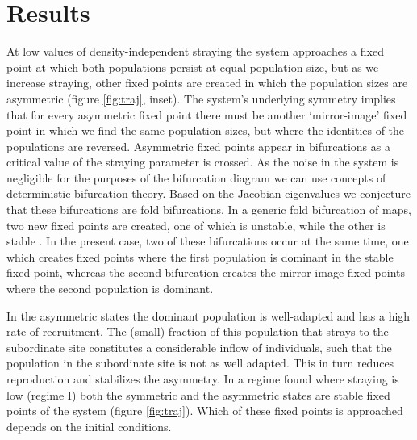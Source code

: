 \documentclass{revtex4}
\begin{document}
\section{Results}

\noindent At low values of density-independent straying the system approaches a fixed point at which both populations persist at equal population size, but as we increase straying, other fixed points are created in which the population sizes are asymmetric (figure \ref{fig:traj}, inset).
The system's underlying symmetry implies that for every asymmetric fixed point there must be another `mirror-image' fixed point in which we find the same population sizes, but where the identities of the populations are reversed.
Asymmetric fixed points appear in bifurcations as a critical value of the straying parameter is crossed. 
As the noise in the system is negligible for the purposes of the bifurcation diagram we can use concepts of deterministic bifurcation theory. 
Based on the Jacobian eigenvalues we conjecture that these bifurcations are fold bifurcations. 
In a generic fold bifurcation of maps, two new fixed points are created, one of which is unstable, while the other is stable \citep{GuckHolmes}. 
In the present case, two of these bifurcations occur at the same time, one which creates fixed points where the first population is dominant in the stable fixed point, whereas the second bifurcation creates the mirror-image fixed points where the second population is dominant.      

In the asymmetric states the dominant population is well-adapted and has a high rate of recruitment. 
The (small) fraction of this population that strays to the subordinate site constitutes a considerable inflow of individuals, such that the population in the subordinate site is not as well adapted.
This in turn reduces reproduction and stabilizes the asymmetry. 
In a regime found where straying is low (regime I) both the symmetric and the asymmetric states are stable fixed points of the system (figure \ref{fig:traj}). 
Which of these fixed points is approached depends on the initial conditions. 
\end{document}

